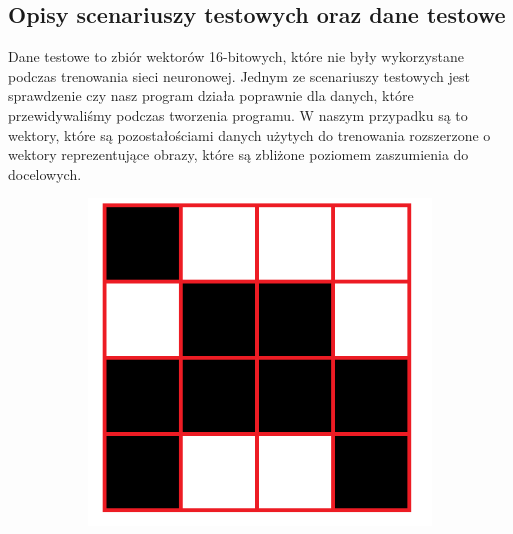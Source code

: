 \documentclass[a4paper, titleauthor]{mwart}
\begin{document}
\subsection{Opisy scenariuszy testowych oraz dane testowe}

Dane testowe to zbiór wektorów 16-bitowych, które nie były wykorzystane podczas trenowania sieci neuronowej. 
Jednym ze scenariuszy testowych jest sprawdzenie czy nasz program działa poprawnie dla danych, które przewidywaliśmy podczas tworzenia programu. W naszym przypadku są to wektory, które są pozostałościami danych użytych do trenowania rozszerzone o wektory reprezentujące obrazy, które są zbliżone poziomem zaszumienia do docelowych. 
\newpage
\begin{figure}[htbp]
\centering
\begin{subfigure}{0.3\textwidth}
  \centering
  \includegraphics[width=\linewidth]{O.png}
  \label{fig:sub1}
\end{subfigure}
\begin{subfigure}{0,3\textwidth}
  \centering

\end{subfigure}
\end{figure}
\end{document}
